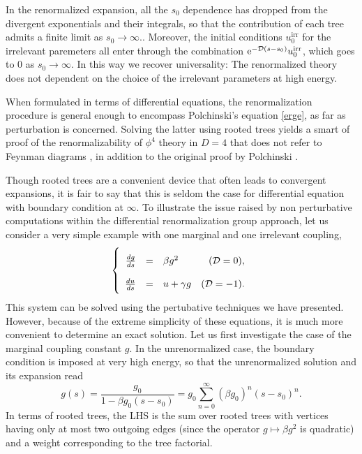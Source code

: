 \documentclass[12pt,here,feynmf]{article}
\begin{document}
In the renormalized expansion, all the $s_{0}$ dependence has dropped from the divergent exponentials and their integrals,  so that the contribution of each tree admits a finite limit as $s_{0}\rightarrow\infty$.. Moreover, the initial conditions $u_{0}^{\mathrm{irr}}$ for the irrelevant paremeters all enter through the combination $\mathrm{e}^{-{\cal D}(s-s_{0})}u_{0}^{\mathrm{irr}}$, which goes to $0$ as $s_{0}\rightarrow\infty$.  In this way we recover universality: The renormalized theory does not dependent on the choice of the irrelevant parameters at high energy. 
 
When formulated in terms of differential equations, the renormalization procedure is general enough to encompass Polchinski's equation \eqref{erge}, as far as perturbation is concerned. Solving the latter using rooted trees yields a smart of proof of the renormalizability of $\phi^{4}$ theory in $D=4$ that does not refer to Feynman diagrams \cite{Hurd}, in addition to the original proof by Polchinski \cite{Polchinski}.

Though rooted trees are a convenient device that often leads to convergent expansions, it is fair to say that this is seldom the case for differential equation with boundary condition at $\infty$.  To illustrate the issue raised by non perturbative computations within the differential renormalization group approach, let us consider a very simple example with one marginal and one irrelevant coupling,
\begin{equation}
\renewcommand{\baselinestretch}{3}
\left\{
\begin{array}{rclr}
\renewcommand{\baselinestretch}{3}
\frac{dg}{ds}&=&\beta g^{2}&({\cal D}=0),\cr \frac{du}{ds}&=&u+\gamma
g&({\cal D}=-1).\label{toybeta}
\end{array}
\right.
\end{equation}
\renewcommand{\baselinestretch}{2}
This system can be solved using the pertubative techniques we have presented. However, because of the extreme simplicity of these equations, it is much more convenient to determine an exact solution. Let us first investigate the case of the marginal coupling constant $g$. In the unrenormalized case, the boundary condition is imposed at very high energy, so that the unrenormalized solution and its expansion read
 \begin{equation}
g(s)=\frac{g_{0}}{1-\beta g_{0}(s-s_{0})}=g_{0}\sum_{n=0}^{\infty}(\beta g_{0})^{n}(s-s_{0})^{n}.
\label{bareg}
 \end{equation}
In terms of rooted trees, the LHS is the sum over rooted trees with vertices having only at most two   outgoing edges (since the operator $g\mapsto\beta g^{2}$ is quadratic) and a weight corresponding to the tree factorial.
\end{document}
